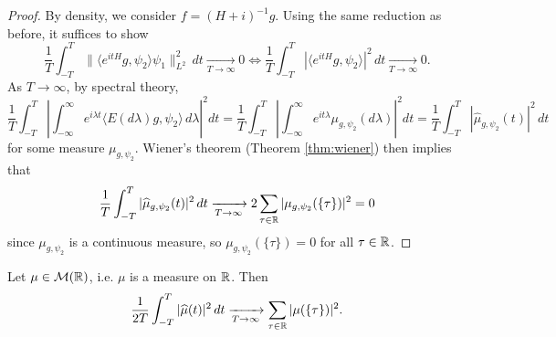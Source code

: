 \begin{proof}
  By density,
  we consider $f = (H + i)^{-1} g$. Using
  the same reduction as before, it suffices
  to show
  \[
    \frac{1}{T} \int_{-T}^T \|\langle e^{itH} g, \psi_2 \rangle \psi_1\|_{L^2}^2\, dt \xrightarrow[T \to \infty]{} 0
    \iff
    \frac{1}{T} \int_{-T}^T |\langle e^{itH} g, \psi_2\rangle|^2\, dt \xrightarrow[T \to \infty]{} 0.
  \]
  As $T \to \infty$, by spectral theory,
  \[
    \frac{1}{T} \int_{-T}^T \left| \int_{-\infty}^\infty e^{i\lambda t} \langle E(d\lambda) g, \psi_2 \rangle\, d\lambda \right|^2 dt
    = \frac{1}{T} \int_{-T}^T \left| \int_{-\infty}^\infty e^{i t \lambda} \mu_{g, \psi_2}(d\lambda) \right|^2 dt
    = \frac{1}{T} \int_{-T}^T |\widehat{\mu}_{g, \psi_2}(t)|^2\, dt
  \]
  for some measure $\mu_{g, \psi_2}$.
  Wiener's theorem (Theorem \ref{thm:wiener})
  then implies that
  \[
    \frac{1}{T} \int_{-T}^T |\widehat{\mu}_{g, \psi_2}(t)|^2\, dt
    \xrightarrow[T \to \infty]{}
    2 \sum_{\tau \in \mathbb{R}} |\mu_{g, \psi_2}(\{\tau\})|^2 = 0
  \]
  since $\mu_{g, \psi_2}$ is a continuous
  measure, so
  $\mu_{g, \psi_2}(\{\tau\}) = 0$ for all $\tau \in \mathbb{R}$.
\end{proof}

\begin{theorem}[Wiener]\label{thm:wiener}
  Let $\mu \in \mathcal{M}(\mathbb{R})$, i.e. $\mu$ is
  a measure on $\mathbb{R}$. Then
  \[
    \frac{1}{2T} \int_{-T}^T |\widehat{\mu}(t)|^2\, dt
    \xrightarrow[T \to \infty]{} \sum_{\tau \in \mathbb{R}} |\mu(\{\tau\})|^2.
  \]
\end{theorem}

